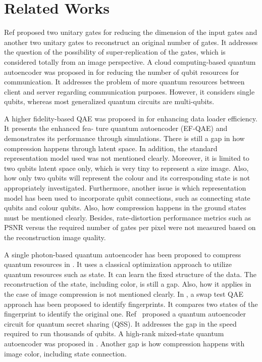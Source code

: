 \section{Related Works}
\label{L_R}
Ref \cite{chiribella2015universal} proposed two unitary gates for reducing the dimension of the input gates and another two unitary gates to reconstruct an original number of gates. It addresses the question of the possibility of super-replication of the gates, which is considered totally from an image perspective. A cloud computing-based quantum autoencoder was proposed in \cite{zhu2023quantum} for reducing the number of qubit resources for communication. It addresses the problem of more quantum resources between client and server regarding communication purposes. However, it considers single qubits, whereas most generalized quantum circuits are multi-qubits.  

A higher fidelity-based QAE was proposed in \cite{bravo2021quantum} for enhancing data loader efficiency. It presents the enhanced fea-
ture quantum autoencoder (EF-QAE) and demonstrates its
performance through simulations. There is still a gap in how compression happens through latent space. In addition, the standard representation model used was not mentioned clearly. Moreover, it is limited to two qubits  latent space only, which is very tiny to represent a size image. Also, how only two qubits will represent the colour and its corresponding state is not appropriately investigated. Furthermore, another issue is which representation model has been used to incorporate qubit connections, such as connecting state qubits and colour qubits. Also, how compression happens in the ground states must be mentioned clearly. Besides, rate-distortion performance metrics such as PSNR versus the required number of gates per pixel were not measured based on the reconstruction image quality. 

A single photon-based quantum autoencoder has been proposed to compress quantum resources in \cite{pepper2019experimental}. It uses a classical optimization approach to utilize quantum resources such as state. It can learn the fixed structure of the data. The reconstruction of the state, including color, is still a gap. Also, how it applies in the case of image compression is not mentioned clearly. In \cite{buhrman2001quantum}, a swap test  QAE approach has been proposed to identify fingerprints. It compares two states of the fingerprint to identify the original one. Ref~\cite{achache2020denoising} proposed a quantum autoencoder circuit for quantum secret sharing (QSS). It addresses the gap in the speed required to run thousands of qubits. A high-rank mixed-state quantum autoencoder was proposed in \cite{cao2021noise}. Another gap is how compression happens with image color, including state connection.

